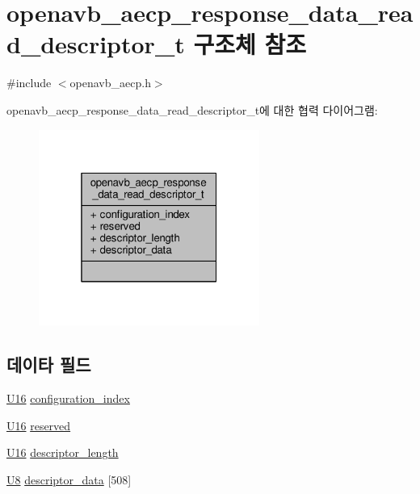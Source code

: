 \hypertarget{structopenavb__aecp__response__data__read__descriptor__t}{}\section{openavb\+\_\+aecp\+\_\+response\+\_\+data\+\_\+read\+\_\+descriptor\+\_\+t 구조체 참조}
\label{structopenavb__aecp__response__data__read__descriptor__t}


{\ttfamily \#include $<$openavb\+\_\+aecp.\+h$>$}



openavb\+\_\+aecp\+\_\+response\+\_\+data\+\_\+read\+\_\+descriptor\+\_\+t에 대한 협력 다이어그램\+:
\nopagebreak
\begin{figure}[H]
\begin{center}
\leavevmode
\includegraphics[width=205pt]{structopenavb__aecp__response__data__read__descriptor__t__coll__graph}
\end{center}
\end{figure}
\subsection*{데이타 필드}
\begin{DoxyCompactItemize}
\item 
\hyperlink{openavb__types__base__pub_8h_a0a0a322d5fa4a546d293a77ba8b4a71f}{U16} \hyperlink{structopenavb__aecp__response__data__read__descriptor__t_aa4ea2d17e7732c1a15797c10fa40f9bb}{configuration\+\_\+index}
\item 
\hyperlink{openavb__types__base__pub_8h_a0a0a322d5fa4a546d293a77ba8b4a71f}{U16} \hyperlink{structopenavb__aecp__response__data__read__descriptor__t_ac15a687d635cc969d1bfab4d96858b77}{reserved}
\item 
\hyperlink{openavb__types__base__pub_8h_a0a0a322d5fa4a546d293a77ba8b4a71f}{U16} \hyperlink{structopenavb__aecp__response__data__read__descriptor__t_a991bdb9bb060bb8736e1b2e5fab506e1}{descriptor\+\_\+length}
\item 
\hyperlink{openavb__types__base__pub_8h_aa63ef7b996d5487ce35a5a66601f3e73}{U8} \hyperlink{structopenavb__aecp__response__data__read__descriptor__t_ab65704d51b87efd3534c8896de78300e}{descriptor\+\_\+data} \mbox{[}508\mbox{]}
\end{DoxyCompactItemize}


